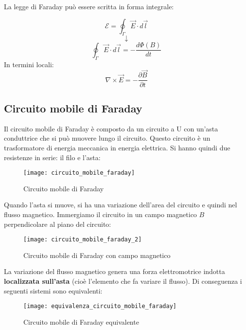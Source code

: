 \documentclass[a4paper]{article}
\begin{document}
\vspace{1em}
\noindent
La legge di Faraday può essere scritta in forma integrale:
\begin{definition}
  \[
    \mathcal{E} = \oint_{\Gamma} \vec{E} \cdot d\vec{l} 
  \] 
  \[
    \downarrow
  \] 
  \[
    \oint_{\Gamma} \vec{E} \cdot d\vec{l} = - \frac{d \Phi (B)}{dt}
  \] 
  In termini locali:
  \[
    \nabla \times \vec{E} = -\frac{\partial \vec{B}}{\partial t}
  \] 
\end{definition}

\subsection{Circuito mobile di Faraday}
Il circuito mobile di Faraday è composto da un circuito a U con un'asta conduttrice
che si può muovere lungo il circuito. Questo circuito è un trasformatore di energia
meccanica in energia elettrica. Si hanno quindi due resistenze in serie: il filo
e l'asta:
\begin{figure}[H]
  \centering
  \texttt{[image: circuito\_mobile\_faraday]}
  \caption{Circuito mobile di Faraday}
\end{figure}
\noindent
Quando l'asta si muove, si ha una variazione dell'area del circuito e quindi nel flusso
magnetico. Immergiamo il circuito in un campo magnetico \( B \) perpendicolare al piano
del circuito:
\begin{figure}[H]
  \centering
  \texttt{[image: circuito\_mobile\_faraday\_2]}
  \caption{Circuito mobile di Faraday con campo magnetico}
\end{figure}
\noindent
La variazione del flusso magnetico genera una forza elettromotrice indotta \textbf{
localizzata sull'asta} (cioè l'elemento che fa variare il flusso). Di conseguenza 
i seguenti sistemi sono equivalenti:
\begin{figure}[H]
  \centering
  \texttt{[image: equivalenza\_circuito\_mobile\_faraday]}
  \caption{Circuito mobile di Faraday equivalente}
\end{figure}
\end{document}
